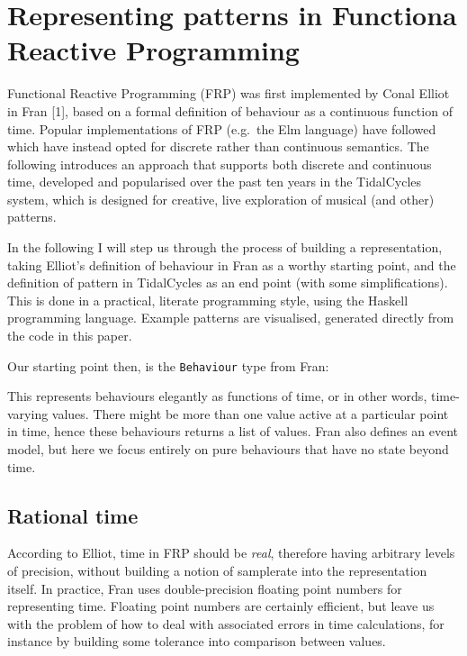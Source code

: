 \section{Representing patterns in Functiona Reactive
Programming}\label{representing-patterns-in-functiona-reactive-programming}

Functional Reactive Programming (FRP) was first implemented by Conal
Elliot in Fran {[}1{]}, based on a formal definition of behaviour as a
continuous function of time. Popular implementations of FRP (e.g.~the
Elm language) have followed which have instead opted for discrete rather
than continuous semantics. The following introduces an approach that
supports both discrete and continuous time, developed and popularised
over the past ten years in the TidalCycles system, which is designed for
creative, live exploration of musical (and other) patterns.

In the following I will step us through the process of building a
representation, taking Elliot's definition of behaviour in Fran as a
worthy starting point, and the definition of pattern in TidalCycles as
an end point (with some simplifications). This is done in a practical,
literate programming style, using the Haskell programming language.
Example patterns are visualised, generated directly from the code in
this paper.

Our starting point then, is the \texttt{Behaviour} type from Fran:

\begin{Shaded}
\begin{Highlighting}[]
  \OtherTok{=} 
 \OtherTok{=}  \OtherTok{{-}\textgreater{}}\NormalTok{ [a]}
\end{Highlighting}
\end{Shaded}

This represents behaviours elegantly as functions of time, or in other
words, time-varying values. There might be more than one value active at
a particular point in time, hence these behaviours returns a list of
values. Fran also defines an event model, but here we focus entirely on
pure behaviours that have no state beyond time.

\subsection{Rational time}\label{rational-time}

According to Elliot, time in FRP should be \emph{real}, therefore having
arbitrary levels of precision, without building a notion of samplerate
into the representation itself. In practice, Fran uses double-precision
floating point numbers for representing time. Floating point numbers are
certainly efficient, but leave us with the problem of how to deal with
associated errors in time calculations, for instance by building some
tolerance into comparison between values.

